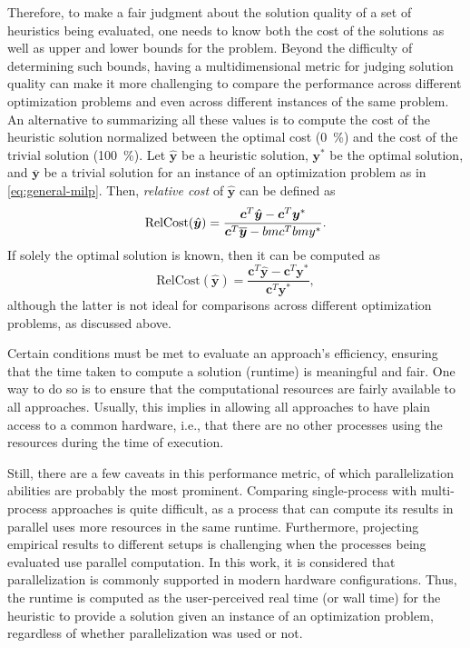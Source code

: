 Therefore, to make a fair judgment about the solution quality of a set of heuristics being evaluated, one needs to know both the cost of the solutions as well as upper and lower bounds for the problem.
Beyond the difficulty of determining such bounds, having a multidimensional metric for judging solution quality can make it more challenging to compare the performance across different optimization problems and even across different instances of the same problem.
An alternative to summarizing all these values is to compute the cost of the heuristic solution normalized between the optimal cost (0~\%) and the cost of the trivial solution (100~\%).
Let $\hat{\bm{y}}$ be a heuristic solution, $\bm{y}^*$ be the optimal solution, and $\overline{\bm{y}}$ be a trivial solution for an instance of an optimization problem as in \eqref{eq:general-milp}.
Then, \emph{relative cost} of $\hat{\bm{y}}$ can be defined as
\begin{equation}
    \text{RelCost}(\hat{\bm{y}}) = \frac{\bm{c}^{T} \hat{\bm{y}} - \bm{c}^{T} \bm{y}^*}{\bm{c}^{T}\overline{\bm{y}} - \\bm{c}^{T}bm{y}^*}
.\end{equation}
If solely the optimal solution is known, then it can be computed as
\begin{equation}
    \text{RelCost}(\hat{\bm{y}}) = \frac{\bm{c}^{T} \hat{\bm{y}} - \bm{c}^{T} \bm{y}^*}{\bm{c}^{T}\bm{y}^*}
,\end{equation}
although the latter is not ideal for comparisons across different optimization problems, as discussed above.

Certain conditions must be met to evaluate an approach's efficiency, ensuring that the time taken to compute a solution (runtime) is meaningful and fair.
One way to do so is to ensure that the computational resources are fairly available to all approaches.
Usually, this implies in allowing all approaches to have plain access to a common hardware, i.e., that there are no other processes using the resources during the time of execution.

Still, there are a few caveats in this performance metric, of which parallelization abilities are probably the most prominent.
Comparing single-process with multi-process approaches is quite difficult, as a process that can compute its results in parallel uses more resources in the same runtime. 
Furthermore, projecting empirical results to different setups is challenging when the processes being evaluated use parallel computation. 
In this work, it is considered that parallelization is commonly supported in modern hardware configurations.
Thus, the runtime is computed as the user-perceived real time (or wall time) for the heuristic to provide a solution given an instance of an optimization problem, regardless of whether parallelization was used or not.

